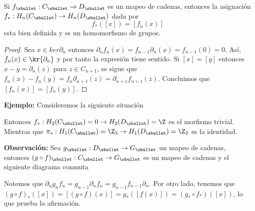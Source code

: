 \documentclass{article}
\begin{document}
\vspace{2mm}
\begin{lema}
    Si $f_{\sbullet}:C_{\sbullet}\to D_{\sbullet}$ es un mapeo de cadenas, entonces la asignación 
    $f_{*}:H_{n}(C_{\sbullet})\to H_{n}(D_{\sbullet})$ dada por
    \begin{equation*}
        f_{*}([x])=[f_{n}(x)]
    \end{equation*}
    esta bien definida y es un homomorfismo de grupos.
\end{lema}
\begin{proof}
    Sea $x\in ker\partial_{n}$ entonces $\partial_{n}f_{n}(x)=f_{n-1}\partial_{n}(x)
    =f_{n-1}(0)=0$. Así, $f_{n}(x)\in\kr{\partial_{n}}$ y por tanto la expresión tiene sentido. Si
    $[x]=[y]$ entonces $x-y=\partial_{n}(z)$ para $z\in C_{n+1}$, se sigue que 
    $f_{n}(x)-f_{n}(y)=f_{n}\partial_{n+1}(z)=\partial_{n+1}f_{n+1}(z)$. Concluimos que 
    $[f_{n}(x)]=[f_{n}(y)]$.
\end{proof}

\noindent\textbf{Ejemplo:}
Consideremos la siguiente situación

\vspace{2mm}
\centerline{
}
\vspace{2mm}
\noindent Entonces $f_{*}:H_{2}(C_{\sbullet})=0\to H_{2}(D_{\sbullet})=\Z$ es el morfismo trivial. 
Mientras que $\pi_{*}:H_{1}(C_{\sbullet})=\Z_{3}\to H_{1}(D_{\sbullet})=\Z_{3}$ es la identidad.

\vspace{2mm}
\noindent\textbf{Observación:} Sea $g_{\sbullet}:D_{\sbullet}\to G_{\sbullet}$ un mapeo de 
cadenas, entonces $(g\circ f)_{\sbullet}:C_{\sbullet}\to G_{\sbullet}$ es un mapeo de cadenas y el 
siguiente diagrama conmuta

\vspace{2mm}
\centerline{
}
\vspace{2mm}
\noindent Notemos que $\partial_{n}g_{n} f_{n}=g_{n-1}\partial_{n}f_{n}=g_{n-1}f_{n-1}
\partial_{n}$. Por otro lado, tenemos que $(g\circ f)_{*}([x])=[(g\circ f)(x)]=g_{*}([f(x)])=
(g_{*}\circ f_{*})([x])$, lo que prueba la afirmación.
\end{document}
